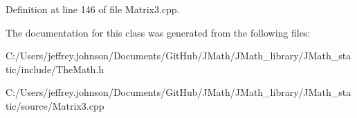 Definition at line 146 of file Matrix3.\+cpp.



The documentation for this class was generated from the following files\+:\begin{DoxyCompactItemize}
\item 
C\+:/\+Users/jeffrey.\+johnson/\+Documents/\+Git\+Hub/\+J\+Math/\+J\+Math\+\_\+library/\+J\+Math\+\_\+static/include/The\+Math.\+h\item 
C\+:/\+Users/jeffrey.\+johnson/\+Documents/\+Git\+Hub/\+J\+Math/\+J\+Math\+\_\+library/\+J\+Math\+\_\+static/source/Matrix3.\+cpp\end{DoxyCompactItemize}
